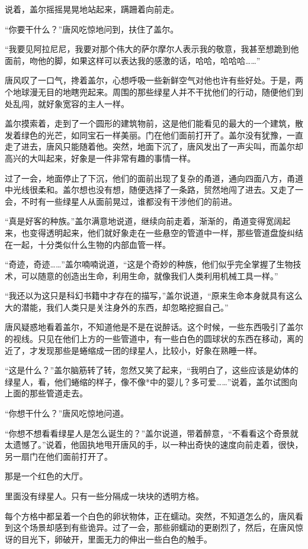 说着，盖尔摇摇晃晃地站起来，蹒跚着向前走。

“你要干什么？”唐风吃惊地问到，扶住了盖尔。

“我要见阿拉尼尼，我要对那个伟大的萨尔摩尔人表示我的敬意，我甚至想跪到他面前，吻他的脚，如果这样可以表达我的感激的话，哈哈，哈哈哈……”

唐风叹了一口气，搀着盖尔，心想呼吸一些新鲜空气对他也许有些好处。于是，两个地球漫无目的地瞎兜起来。周围的那些绿星人并不干扰他们的行动，随便他们到处乱闯，就好象宽容的主人一样。

盖尔摸索着，走到了一个圆形的建筑物前，这是他们能看见的最大的一个建筑，散发着绿色的光芒，如同宝石一样美丽。门在他们面前打开了。盖尔没有犹豫，一直走了进去，唐风只能随着他。突然，地面下沉了，唐风发出了一声尖叫，而盖尔却高兴的大叫起来，好象是一件非常有趣的事情一样。

过了一会，地面停止了下沉，他们的面前出现了复杂的甬道，通向四面八方，甬道中光线很柔和。盖尔想也没有想，随便选择了一条路，贸然地闯了进去。又走了一会，不时有一些绿星人从面前晃过，谁都没有干涉他们的前进。

“真是好客的种族。”盖尔满意地说道，继续向前走着，渐渐的，甬道变得宽阔起来，也变得透明起来，他们就好象走在一些悬空的管道中一样，那些管道盘旋纠结在一起，十分类似什么生物的内部血管一样。

“奇迹，奇迹……”盖尔喃喃说道，“这是个奇妙的种族，他们似乎完全掌握了生物技术，可以随意的创造出生命，利用生命，就像我们人类利用机械工具一样。”

“我还以为这只是科幻书籍中才存在的描写，”盖尔说道，“原来生命本身就具有这么大的潜能，我们人类只是关注身外的东西，却忽略挖掘自己。”

唐风疑惑地看着盖尔，不知道他是不是在说醉话。这个时候，一些东西吸引了盖尔的视线。只见在他们上方的一些管道中，有一些白色的圆球状的东西在移动，离的近了，才发现那些是蜷缩成一团的绿星人，比较小，好象在熟睡一样。

“这是什么？”盖尔脑筋转了转，忽然又笑了起来，“我明白了，这些应该是幼体的绿星人，看，他们蜷缩的样子，像不像*中的婴儿？多可爱……”说着，盖尔试图向上面的那些管道走去。

“你想干什么？”唐风吃惊地问道。

“你想不想看看绿星人是怎么诞生的？”盖尔说道，带着醉意，“不看看这个奇景就太遗憾了。”说着，他固执地甩开唐风的手，以一种出奇快的速度向前走着，很快，另一扇门在他们面前打开了。

那是一个红色的大厅。

里面没有绿星人。只有一些分隔成一块块的透明方格。

每个方格中都呈着一个白色的卵状物体，正在蠕动。突然，不知道怎么的，唐风看到这个场景却感到有些诡异。过了一会，那些卵蠕动的更剧烈了，然后，在唐风惊讶的目光下，卵破开，里面无力的伸出一些白色的触手。

